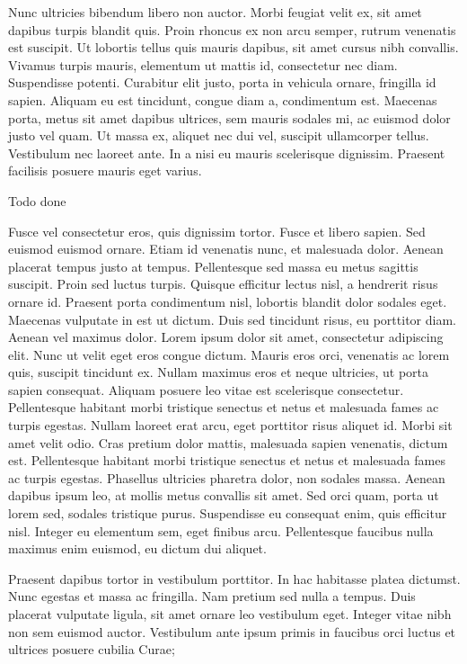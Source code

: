 \documentclass{article}
\begin{document}
Nunc ultricies bibendum libero non auctor. Morbi feugiat velit ex, sit amet dapibus turpis blandit quis. Proin rhoncus ex non arcu semper, rutrum venenatis est suscipit. Ut lobortis tellus quis mauris dapibus, sit amet cursus nibh convallis. Vivamus turpis mauris, elementum ut mattis id, consectetur nec diam. Suspendisse potenti. Curabitur elit justo, porta in vehicula ornare, fringilla id sapien. Aliquam eu est tincidunt, congue diam a, condimentum est. Maecenas porta, metus sit amet dapibus ultrices, sem mauris sodales mi, ac euismod dolor justo vel quam. Ut massa ex, aliquet nec dui vel, suscipit ullamcorper tellus. Vestibulum nec laoreet ante. In a nisi eu mauris scelerisque dignissim. Praesent facilisis posuere mauris eget varius.


Todo done

Fusce vel consectetur eros, quis dignissim tortor. Fusce et libero sapien. Sed euismod euismod ornare. Etiam id venenatis nunc, et malesuada dolor. Aenean placerat tempus justo at tempus. Pellentesque sed massa eu metus sagittis suscipit. Proin sed luctus turpis. Quisque efficitur lectus nisl, a hendrerit risus ornare id. Praesent porta condimentum nisl, lobortis blandit dolor sodales eget. Maecenas vulputate in est ut dictum. Duis sed tincidunt risus, eu porttitor diam. Aenean vel maximus dolor.
Lorem ipsum dolor sit amet, consectetur adipiscing elit. Nunc ut velit eget eros congue dictum. Mauris eros orci, venenatis ac lorem quis, suscipit tincidunt ex. Nullam maximus eros et neque ultricies, ut porta sapien consequat. Aliquam posuere leo vitae est scelerisque consectetur. Pellentesque habitant morbi tristique senectus et netus et malesuada fames ac turpis egestas. Nullam laoreet erat arcu, eget porttitor risus aliquet id. Morbi sit amet velit odio. Cras pretium dolor mattis, malesuada sapien venenatis, dictum est. Pellentesque habitant morbi tristique senectus et netus et malesuada fames ac turpis egestas. Phasellus ultricies pharetra dolor, non sodales massa. Aenean dapibus ipsum leo, at mollis metus convallis sit amet. Sed orci quam, porta ut lorem sed, sodales tristique purus. Suspendisse eu consequat enim, quis efficitur nisl. Integer eu elementum sem, eget finibus arcu. Pellentesque faucibus nulla maximus enim euismod, eu dictum dui aliquet.

Praesent dapibus tortor in vestibulum porttitor. In hac habitasse platea dictumst. Nunc egestas et massa ac fringilla. Nam pretium sed nulla a tempus. Duis placerat vulputate ligula, sit amet ornare leo vestibulum eget. Integer vitae nibh non sem euismod auctor. Vestibulum ante ipsum primis in faucibus orci luctus et ultrices posuere cubilia Curae;
\end{document}
